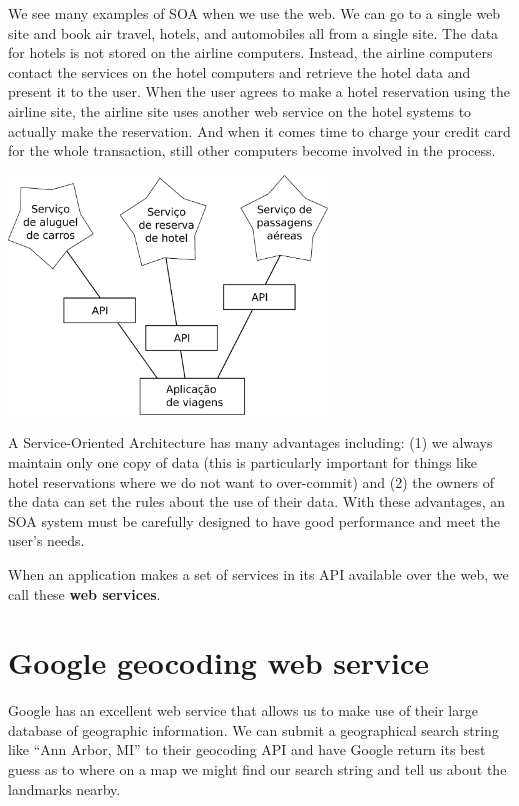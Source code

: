We see many examples of SOA when we use the web.  We can go to a single 
web site and book air travel, hotels, and automobiles all from a 
single site.  The data for hotels is not stored on the airline computers. 
Instead, the airline computers contact the services on the hotel computers
and retrieve the hotel data and present it to the user.  When the user
agrees to make a hotel reservation using the airline site, the airline site uses
another web service on the hotel systems to actually make the reservation.
And when it comes time to charge your credit card for the whole transaction, 
still other computers become involved in the process.

\beforefig
\centerline{\includegraphics[height=2.50in]{figs2/soa.eps}}
\afterfig

A Service-Oriented Architecture has many advantages including: (1) we 
always maintain only one copy of data (this is particularly important
for things like hotel reservations where we do not want to over-commit)
and (2) the owners of the data can set the rules about the use of their 
data.   With these advantages, an SOA system must be carefully designed
to have good performance and meet the user's needs.

When an application makes a set of services in its API available over the web, 
we call these {\bf web services}. 

\section{Google geocoding web service}

Google has an excellent web service that allows us to make use of their 
large database of geographic information.   We can submit a geographical
search string like ``Ann Arbor, MI'' to their geocoding API and have Google 
return its best guess as to where on a map we might find our search string and
tell us about the landmarks nearby.

